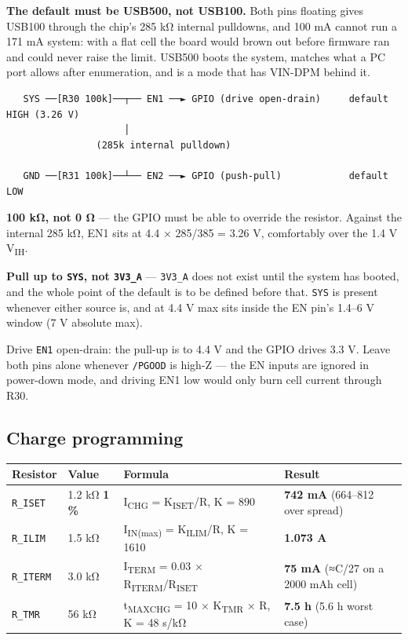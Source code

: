 \documentclass[11pt]{article}
\begin{document}
\textbf{The default must be USB500, not USB100.} Both pins floating gives USB100 through the chip's
285 kΩ internal pulldowns, and 100 mA cannot run a 171 mA system: with a flat cell the board would
brown out before firmware ran and could never raise the limit. USB500 boots the system, matches what
a PC port allows after enumeration, and is a mode that has VIN-DPM behind it.

\begin{Verbatim}
   SYS ──[R30 100k]──┬── EN1 ──► GPIO (drive open-drain)     default HIGH (3.26 V)
                     │
                (285k internal pulldown)

   GND ──[R31 100k]──┴── EN2 ──► GPIO (push-pull)            default LOW
\end{Verbatim}

\textbf{100 kΩ, not 0 Ω} — the GPIO must be able to override the resistor. Against the internal
285 kΩ, EN1 sits at 4.4 × 285/385 = 3.26 V, comfortably over the 1.4 V V\textsubscript{IH}.

\textbf{Pull up to \texttt{SYS}, not \texttt{3V3_A}} — \texttt{3V3_A} does not exist until the system
has booted, and the whole point of the default is to be defined before that. \texttt{SYS} is present
whenever either source is, and at 4.4 V max sits inside the EN pin's 1.4–6 V window (7 V absolute
max).

Drive \texttt{EN1} open-drain: the pull-up is to 4.4 V and the GPIO drives 3.3 V. Leave both pins
alone whenever \texttt{/PGOOD} is high-Z — the EN inputs are ignored in power-down mode, and driving
EN1 low would only burn cell current through R30.

\subsection{Charge programming}

\begin{tabularx}{\linewidth}{@{}l l X l@{}}
\toprule
\textbf{Resistor} & \textbf{Value} & \textbf{Formula} & \textbf{Result} \\
\midrule
\texttt{R_ISET} & 1.2 kΩ \textbf{1 \%} & I\textsubscript{CHG} = K\textsubscript{ISET}/R, K = 890 & \textbf{742 mA} (664–812 over spread) \\
\texttt{R_ILIM} & 1.5 kΩ & I\textsubscript{IN(max)} = K\textsubscript{ILIM}/R, K = 1610 & \textbf{1.073 A} \\
\texttt{R_ITERM} & 3.0 kΩ & I\textsubscript{TERM} = 0.03 × R\textsubscript{ITERM}/R\textsubscript{ISET} & \textbf{75 mA} (≈C/27 on a 2000 mAh cell) \\
\texttt{R_TMR} & 56 kΩ & t\textsubscript{MAXCHG} = 10 × K\textsubscript{TMR} × R, K = 48 s/kΩ & \textbf{7.5 h} (5.6 h worst case) \\
\bottomrule
\end{tabularx}
\end{document}
